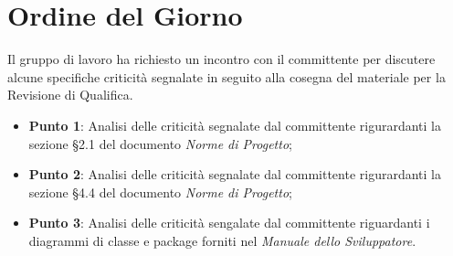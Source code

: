 \section{Ordine del Giorno}
Il gruppo di lavoro ha richiesto un incontro con il committente per discutere alcune specifiche criticità segnalate in seguito alla cosegna del materiale per la Revisione di Qualifica.
\begin{itemize}
	\item \textbf{Punto 1}: Analisi delle criticità segnalate dal committente rigurardanti la sezione §2.1 del documento \textit{Norme di Progetto};
	\item \textbf{Punto 2}: Analisi delle criticità segnalate dal committente rigurardanti la sezione §4.4 del documento \textit{Norme di Progetto};
	\item \textbf{Punto 3}: Analisi delle criticità sengalate dal committente riguardanti i diagrammi di classe e package forniti nel \textit{Manuale dello Sviluppatore}.
\end{itemize}